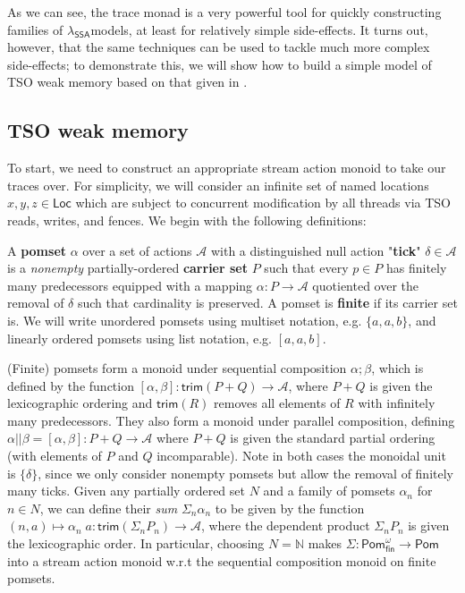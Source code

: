 \documentclass[acmsmall,screen,review]{acmart}
\newcommand{\mc}[1]{\ensuremath{\mathcal{#1}}}
\newcommand{\ms}[1]{\ensuremath{\mathsf{#1}}}
\newcommand{\nats}{\mathbb{N}}
\newcommand{\isotopessa}{\(\lambda_{\ms{SSA}}\)}
\begin{document}
As we can see, the trace monad is a very powerful tool for quickly constructing families of
\isotopessa models, at least for relatively simple side-effects. It turns out, however, that the
same techniques can be used to tackle much more complex side-effects; to demonstrate this, we will
show how to build a simple model of TSO weak memory based on that given in \citet{sparky}.

\subsection{TSO weak memory}

\label{ssec:tso}

To start, we need to construct an appropriate stream action monoid to take our traces over. For
simplicity, we will consider an infinite set of named locations \(x, y, z \in \ms{Loc}\) which are
subject to concurrent modification by all threads via TSO reads, writes, and fences. We begin with
the following definitions:
\begin{definition}[Pomset] 
  A \textbf{pomset} \(\alpha\) over a set of actions \(\mc{A}\) with a distinguished null action
  "\textbf{tick}" \(\delta \in \mc{A}\) is a \textit{nonempty} partially-ordered \textbf{carrier
  set} \(P\) such that every \(p \in P\) has finitely many predecessors equipped with a mapping
  \(\alpha: P \to \mc{A}\) quotiented over the removal of \(\delta\) such that cardinality is
  preserved. A pomset is \textbf{finite} if its carrier set is. We will write unordered pomsets
  using multiset notation, e.g. \(\{a, a, b\}\), and linearly ordered pomsets using list notation,
  e.g. \([a, a, b]\).
\end{definition}
(Finite) pomsets form a monoid under sequential composition \(\alpha;\beta\), which is defined by
the function \([\alpha, \beta]: \ms{trim}(P + Q) \to \mc{A}\), where \(P + Q\) is given the
lexicographic ordering and \(\ms{trim}(R)\) removes all elements of \(R\) with infinitely many
predecessors. They also form a monoid under parallel composition, defining \(\alpha || \beta =
[\alpha, \beta]: P + Q \to \mc{A}\) where \(P + Q\) is given the standard partial ordering (with
elements of \(P\) and \(Q\) incomparable). Note in both cases the monoidal unit is \(\{\delta\}\),
since we only consider nonempty pomsets but allow the removal of finitely many ticks. Given any
partially ordered set \(N\) and a family of pomsets \(\alpha_n\) for \(n \in N\), we can define
their \textit{sum} \(\Sigma_n\alpha_n\) to be given by the function \((n, a) \mapsto \alpha_n\;a:
\ms{trim}(\Sigma_nP_n) \to \mc{A}\), where the dependent product \(\Sigma_nP_n\) is given the
lexicographic order. In particular, choosing \(N = \nats\) makes \(\Sigma:
\ms{Pom}_{\ms{fin}}^\omega \to \ms{Pom}\) into a stream action monoid w.r.t the sequential
composition monoid on finite pomsets. 
\end{document}
